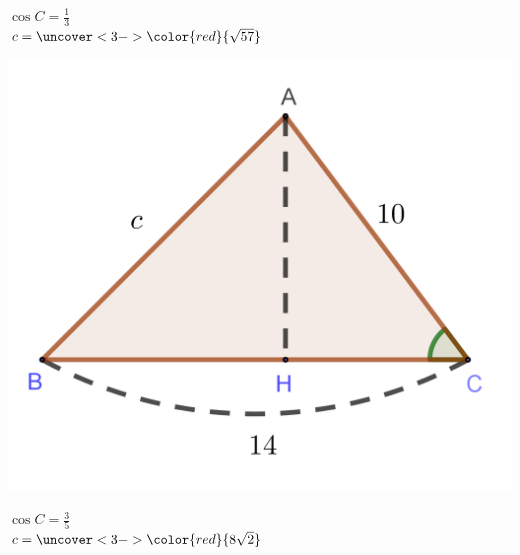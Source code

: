 \documentclass[t,8pt]{beamer}
\newcommand{\red}[1]{\color{red}{#1}}
\begin{document}
\begin{frame}{\subsecname}
\begin{minipage}{.26\textwidth}
\end{minipage}
\begin{minipage}{.15\textwidth}\centering
\(\cos C=\frac13\)\\[20pt]
\(c=\uncover<3->{\red{\sqrt{57}}}\)
\end{minipage}
\qquad\qquad\quad
\begin{minipage}{.26\textwidth}\centering
\includegraphics[width=\textwidth]{img/3-3_coslaw_2-2}
\end{minipage}
\begin{minipage}{.15\textwidth}\centering
\(\cos C=\frac35\)\\[20pt]
\(c=\uncover<3->{\red{8\sqrt2}}\)
\end{minipage}


\end{frame}
\end{document}
